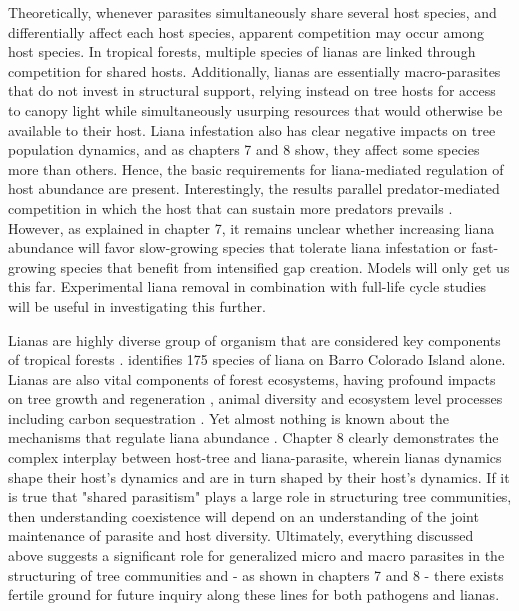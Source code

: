 \documentclass[b5paper,justified]{tufte-book} %
\begin{document}
\begin{fullwidth}
Theoretically, whenever parasites simultaneously share several host species, and differentially affect each host species, apparent competition may occur among host species. In tropical forests, multiple species of lianas are linked through competition for shared hosts. Additionally, lianas are essentially macro-parasites that do not invest in structural support, relying instead on tree hosts for access to canopy light while simultaneously usurping resources that would otherwise be available to their host. Liana infestation also has clear negative impacts on tree population dynamics, and as chapters 7 and 8 show, they affect some species more than others. Hence, the basic requirements for liana-mediated regulation of host abundance are present. Interestingly, the results parallel predator-mediated competition in which the host that can sustain more predators prevails \citep{Holt1994}. However, as explained in chapter 7, it remains unclear whether increasing liana abundance will favor slow-growing species that tolerate liana infestation or fast-growing species that benefit from intensified gap creation. Models will only get us this far. Experimental liana removal in combination with full-life cycle studies will be useful in investigating this further. 

Lianas are highly diverse group of organism that are considered key components of tropical forests \citep{Schnitzer2002}. \citet{Croat1978} identifies 175 species of liana on Barro Colorado Island alone. Lianas are also vital components of forest ecosystems, having profound impacts on tree growth and regeneration \citep[][Chapter 7]{Schnitzer2000, Ingwell2010}, animal diversity \citep{Montgomery1978, Yanoviak2015} and ecosystem level processes including carbon sequestration \citep{Heijden2015}. Yet almost nothing is known about the mechanisms that regulate liana abundance \citep{Muller-Landau2016}. Chapter 8 clearly demonstrates the complex interplay between host-tree and liana-parasite, wherein lianas dynamics shape their host's dynamics and are in turn shaped by their host's dynamics. If it is true that "shared parasitism" plays a large role in structuring tree communities, then understanding coexistence will depend on an understanding of the joint maintenance of parasite and host diversity. Ultimately, everything discussed above suggests a significant role for generalized micro and macro parasites in the structuring of tree communities and - as shown in chapters 7 and 8 - there exists fertile ground for future inquiry along these lines for both pathogens and lianas. 


\end{fullwidth}
\end{document}
